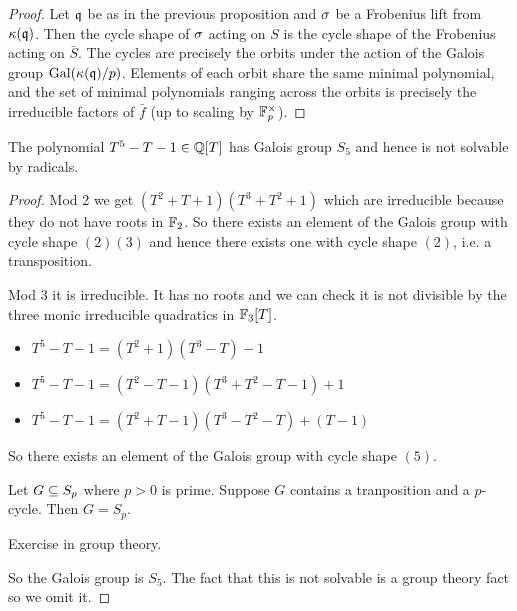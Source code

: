 \documentclass{article}
\begin{document}
\begin{proof}
  Let $\mathfrak{q}$ be as in the previous proposition and 
  $\sigma$ be a Frobenius lift from $\kappa(\mathfrak{q})$.
  Then the cycle shape of $\sigma$ acting on $S$ is the cycle shape
  of the Frobenius acting on $\bar{S}$.
  The cycles are precisely the orbits under the action of
  the Galois group $\operatorname{Gal}(\kappa(\mathfrak{q}) / p)$.
  Elements of each orbit share the same minimal polynomial,
  and the set of minimal polynomials ranging across the orbits
  is precisely the irreducible factors of $\bar{f}$
  (up to scaling by $\mathbb{F}_p^\times$).
\end{proof}

\begin{prop}
  
  The polynomial $T^5 - T - 1 \in \mathbb{Q}[T]$ has Galois group $S_5$
  and hence is not solvable by radicals.
\end{prop}
\begin{proof}
  Mod 2 we get $(T^2 + T + 1)(T^3 + T^2 + 1)$
  which are irreducible because they do not have roots in $\mathbb{F}_2$.
  So there exists an element of the Galois group
  with cycle shape $(2) (3)$ and hence there exists one
  with cycle shape $(2)$, i.e. a transposition.

  Mod 3 it is irreducible.
  It has no roots and we can check
  it is not divisible by the three monic irreducible quadratics
  in $\mathbb{F}_3[T]$.
  \begin{itemize}
    \item $T^5 - T - 1 = (T^2 + 1)(T^3 - T) - 1$
    \item $T^5 - T - 1 = (T^2 - T - 1)(T^3 + T^2 - T - 1) + 1$
    \item $T^5 - T - 1 = (T^2 + T - 1)(T^3 - T^2 - T) + (T - 1)$
  \end{itemize}
  So there exists an element of the Galois group
  with cycle shape $(5)$.
  \begin{lem}
    Let $G \subseteq S_p$ where $p > 0$ is prime.
    Suppose $G$ contains a tranposition and a $p$-cycle.
    Then $G = S_p$.
    \begin{proof1}
      Exercise in group theory.
    \end{proof1}
  \end{lem}
  So the Galois group is $S_5$.
  The fact that this is not solvable is a group theory fact
  so we omit it.
\end{proof}
\end{document}
